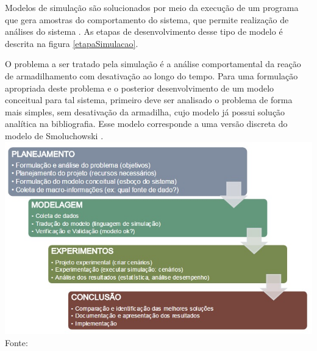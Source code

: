 Modelos de simulação são solucionados por meio da execução de um programa que
gera amostras do comportamento do sistema, que permite realização de análises
do sistema \cite{1}. As etapas de desenvolvimento desse tipo de modelo é
descrita na figura \ref{etapaSimulacao}.

O problema a ser tratado pela simulação é a análise comportamental da reação de
armadilhamento com desativação ao longo do tempo. Para uma formulação apropriada
deste problema e o posterior desenvolvimento de um modelo conceitual para tal
sistema, primeiro deve ser analisado o problema de forma mais simples, sem
desativação da armadilha, cujo modelo já possui solução analítica na
bibliografia. Esse modelo corresponde a uma versão discreta do modelo de
Smoluchowski \cite{5}.\\

{ \centering
	\captionsetup{type=figure}
	\includegraphics[width=\columnwidth]{./figures/012-EtapaSimulacao.jpg}\\
	Fonte: \cite{1}\\\hspace{\columnwidth}\\
	\label{etapaSimulacao}
}
